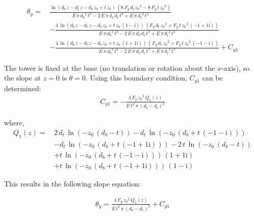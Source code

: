 \begin{align}
	\theta_y =\, &\frac{\ln\left(d_{b}\,z-d_{t}\,z-d_{b}\,z_{0}+t\,z_{0}\right)\,\left(8\,F_{y}\,d_{t}\,{z_{0}}^2-8\,F_{y}\,t\,{z_{0}}^2\right)}{E\,\pi \,{d_{b}}^2\,t^3-2\,E\,\pi \,d_{b}\,d_{t}\,t^3+E\,\pi \,{d_{t}}^2\,t^3} \nonumber \\
	&-\frac{4\,\ln\left(d_{b}\,z-d_{t}\,z-d_{b}\,z_{0}+t\,z_{0}\,\left(1-\mathrm{i}\right)\right)\,\left(F_{y}\,d_{t}\,{z_{0}}^2+F_{y}\,t\,{z_{0}}^2\,\left(-1+1{}\mathrm{i}\right)\right)}{E\,\pi \,{d_{b}}^2\,t^3-2\,E\,\pi \,d_{b}\,d_{t}\,t^3+E\,\pi \,{d_{t}}^2\,t^3} \nonumber \\
	&-\frac{4\,\ln\left(d_{b}\,z-d_{t}\,z-d_{b}\,z_{0}+t\,z_{0}\,\left(1+1{}\mathrm{i}\right)\right)\,\left(F_{y}\,d_{t}\,{z_{0}}^2+F_{y}\,t\,{z_{0}}^2\,\left(-1-\mathrm{i}\right)\right)}{E\,\pi \,{d_{b}}^2\,t^3-2\,E\,\pi \,d_{b}\,d_{t}\,t^3+E\,\pi \,{d_{t}}^2\,t^3} + C_{y1}
\end{align}


The tower is fixed at the base (no translation or rotation about the $x$-axis), so the slope at $z=0$ is $\theta=0$.  Using this boundary condition, $C_{y1}$ can be determined:
\begin{align}
	C_{y1} = -\frac{4\,F_{y}\,{z_{0}}^2\,Q_1(z)}{E\,t^3\,\pi \,{\left(d_{b}-d_{t}\right)}^2}
\end{align}

where, 
\begin{align*}
	Q_1(z) =\, &2\,d_{t}\,\ln\left(-z_{0}\,\left(d_{b}-t\right)\right)-d_{t}\,\ln\left(-z_{0}\,\left(d_{b}+t\,\left(-1-\mathrm{i}\right)\right)\right) \\
	&-d_{t}\,\ln\left(-z_{0}\,\left(d_{b}+t\,\left(-1+1{}\mathrm{i}\right)\right)\right)-2\,t\,\ln\left(-z_{0}\,\left(d_{b}-t\right)\right) \\
	&+t\,\ln\left(-z_{0}\,\left(d_{b}+t\,\left(-1-\mathrm{i}\right)\right)\right)\,\left(1+1{}\mathrm{i}\right) \\
	&+t\,\ln\left(-z_{0}\,\left(d_{b}+t\,\left(-1+1{}\mathrm{i}\right)\right)\right)\,\left(1-\mathrm{i}\right)
\end{align*}

This results in the following slope equation:

\begin{align} \label{eq:theta_analytic}
	\theta_y = \frac{4\,F_{y}\,{z_{0}}^2\,Q_2(z)}{E\,t^3\,\pi \,{\left(d_{b}-d_{t}\right)}^2} + C_{y1}
\end{align}

